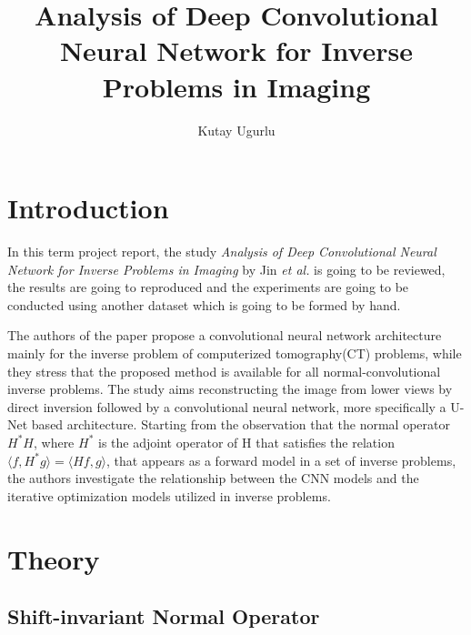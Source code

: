 \documentclass[journal, onecolumn, 11pt]{IEEEtran}
\author{Kutay Ugurlu}
\title{Analysis of Deep Convolutional Neural Network for Inverse Problems in Imaging
}
\begin{document}
\maketitle
\tableofcontents
\listoffigures
\listoftables
\clearpage

\section{Introduction}
In this term project report, the study \textit{Analysis of Deep Convolutional Neural Network for Inverse Problems in Imaging} by Jin \textit{et al.} \cite{FBPConvNet} is going to be reviewed, the results are going to reproduced and the experiments are going to be conducted using another dataset which is going to be formed by hand. 

The authors of the paper propose a convolutional neural network architecture mainly for the inverse problem of computerized tomography(CT) problems, while they stress that the proposed method is available for all normal-convolutional inverse problems. The study aims reconstructing the image from lower views by direct inversion followed by a convolutional neural network, more specifically a U-Net \cite{ronneberger2015u} based architecture. Starting from the observation that the normal operator $H^\ast H$, where $H^\ast$ is the adjoint operator of H that satisfies the relation $\langle f,H^\ast g \rangle = \langle Hf,g \rangle$, that appears as a forward model in a set of inverse problems, the authors investigate the relationship between the CNN models and the iterative optimization models utilized in inverse problems.  

\section{Theory}

\subsection{Shift-invariant Normal Operator}
\end{document}

